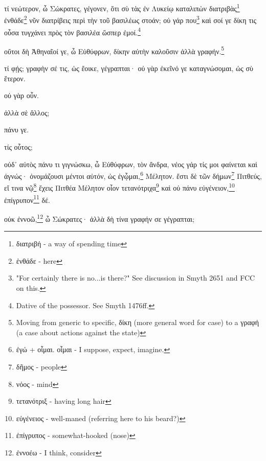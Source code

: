 


\versification{[2a]}
τί
νεώτερον,
ὦ
Σώκρατες,
γέγονεν,
ὅτι
σὺ
τὰς
ἐν
Λυκείῳ
καταλιπὼν
διατριβὰς\footnote{διατριβή - a way of spending time}
ἐνθάδε\footnote{ἐνθάδε - here}
νῦν
διατρίβεις
περὶ
τὴν
τοῦ
βασιλέως
στοάν;
οὐ
γάρ
που\footnote{"For certainly there is no...is there?" See discussion in Smyth 2651 and FCC on this.}
καὶ
σοί
γε
δίκη
τις
οὖσα
τυγχάνει
πρὸς
τὸν
βασιλέα
ὥσπερ
ἐμοί.\footnote{Dative of the possessor. See Smyth 1476ff.}

οὔτοι
δὴ
Ἀθηναῖοί
γε,
ὦ
Εὐθύφρων,
δίκην
αὐτὴν
καλοῦσιν
ἀλλὰ
γραφήν.\footnote{Moving from generic to specific, δίκη (more general word for case) to a γραφή (a case about actions against the state)}

\versification{[2b]}
τί
φῄς;
γραφὴν
σέ
τις,
ὡς
ἔοικε,
γέγραπται·
οὐ
γὰρ
ἐκεῖνό
γε
καταγνώσομαι,
ὡς
σὺ
ἕτερον.

οὐ
γὰρ
οὖν.

ἀλλὰ
σὲ
ἄλλος;

πάνυ
γε.

τίς
οὗτος;

οὐδ᾽
αὐτὸς
πάνυ
τι
γιγνώσκω,
ὦ
Εὐθύφρων,
τὸν
ἄνδρα,
νέος
γάρ
τίς
μοι
φαίνεται
καὶ
ἀγνώς·
ὀνομάζουσι
μέντοι
αὐτόν,
ὡς
ἐγᾦμαι,\footnote{ἐγώ + οἶμαι. οἶμαι - I suppose, expect, imagine.}
Μέλητον.
ἔστι
δὲ
τῶν
δήμων\footnote{δῆμος - people}
Πιτθεύς,
εἴ
τινα
νῷ\footnote{νόος - mind}
ἔχεις
Πιτθέα
Μέλητον
οἷον
τετανότριχα\footnote{τετανότριξ - having long hair}
καὶ
οὐ
πάνυ
εὐγένειον,\footnote{εὐγένειος - well-maned (referring here to his beard?)}
ἐπίγρυπον\footnote{ἐπίγρυπος - somewhat-hooked (nose)}
δέ.

οὐκ
ἐννοῶ,\footnote{ἐννοέω - I think, consider}
ὦ
Σώκρατες·
ἀλλὰ
δὴ
τίνα
γραφήν
\versification{[2c]}
σε
γέγραπται;


